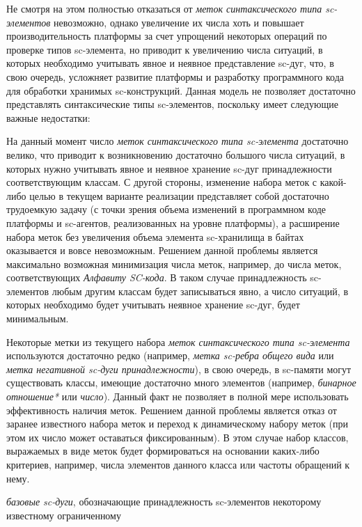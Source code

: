 Не смотря на этом полностью отказаться от \textit{меток синтаксического типа sc-элементов} невозможно, однако увеличение
их числа хоть и повышает производительность платформы за счет упрощений некоторых операций по проверке типов sc-элемента,
но приводит к увеличению числа ситуаций, в которых необходимо учитывать явное и неявное представление sc-дуг, что,
в свою очередь, усложняет развитие платформы и разработку программного кода для обработки хранимых sc-конструкций.
Данная модель не позволяет достаточно представлять синтаксические типы sc-элементов, поскольку имеет следующие важные
недостатки:
\begin{scnitemize}
    \item На данный момент число \textit{меток синтаксического типа sc-элемента} достаточно велико, что приводит к
    возникновению достаточно большого числа ситуаций, в которых нужно учитывать явное и неявное хранение sc-дуг
    принадлежности соответствующим классам. С другой стороны, изменение набора меток с какой-либо целью в текущем
    варианте реализации представляет собой достаточно трудоемкую задачу (с точки зрения объема изменений в программном
    коде платформы и sc-агентов, реализованных на уровне платформы), а расширение набора меток без увеличения объема
    элемента sc-хранилища в байтах оказывается и вовсе невозможным. Решением данной проблемы является максимально
    возможная минимизация числа меток, например, до числа меток, соответствующих \textit{Алфавиту SC-кода}. В таком
    случае принадлежность sc-элементов любым другим классам будет записываться явно, а число ситуаций, в которых
    необходимо будет учитывать неявное хранение sc-дуг, будет минимальным.
    \item Некоторые метки из текущего набора \textit{меток синтаксического типа sc-элемента} используются достаточно
    редко (например, \textit{метка sc-ребра общего вида} или \textit{метка негативной sc-дуги принадлежности}), в
    свою очередь, в sc-памяти могут существовать классы, имеющие достаточно много элементов (например, \textit{бинарное
    отношение*} или \textit{число}). Данный факт не позволяет в полной мере использовать эффективность наличия меток.
    Решением данной проблемы является отказ от заранее известного набора меток и переход к динамическому набору
    меток (при этом их число может оставаться фиксированным). В этом случае набор классов, выражаемых в виде меток
    будет формироваться на основании каких-либо критериев, например, числа элементов данного класса или частоты обращений
    к нему.
    \item \textit{базовые sc-дуги}, обозначающие принадлежность sc-элементов некоторому известному ограниченному

\end{scnitemize}
